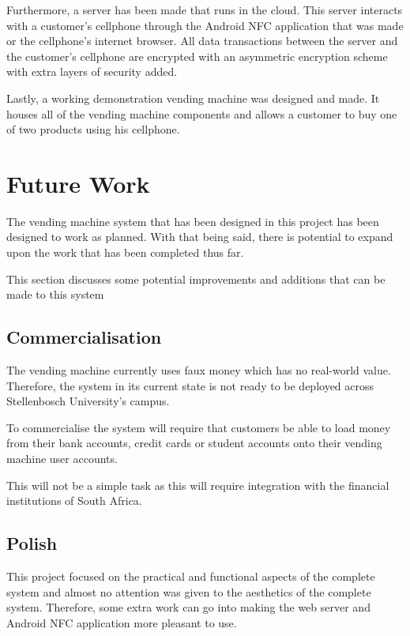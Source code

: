 Furthermore, a server has been made that runs in the cloud. This server interacts with a
customer's cellphone through the Android NFC application that was made or the cellphone's
internet browser. All data transactions between the server and the customer's cellphone
are encrypted with an asymmetric encryption scheme with extra layers of security added.

Lastly, a working demonstration vending machine was designed and made. It houses all of
the vending machine components and allows a customer to buy one of two products using
his cellphone. 

\section{Future Work}

The vending machine system that has been designed in this project has been designed to
work as planned. With that being said, there is potential to expand upon the work that has
been completed thus far.

This section discusses some potential improvements and additions that can be made to this
system

\subsection{Commercialisation}

The vending machine currently uses faux money which has no real-world value. Therefore,
the system in its current state is not ready to be deployed across Stellenbosch
University's campus. 

To commercialise the system will require that customers be able to load money
from their bank accounts, credit cards or student accounts onto their vending machine user
accounts. 

This will not be a simple task as this will require integration with the financial
institutions of South Africa. 

\subsection{Polish}

This project focused on the practical and functional aspects of the complete system and
almost no attention was given to the aesthetics of the complete system. Therefore, some
extra work can go into making the web server and Android NFC application more pleasant to use. 

